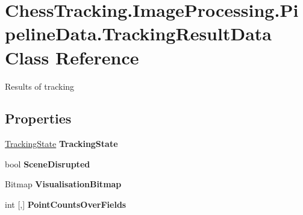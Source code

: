 \hypertarget{class_chess_tracking_1_1_image_processing_1_1_pipeline_data_1_1_tracking_result_data}{}\section{Chess\+Tracking.\+Image\+Processing.\+Pipeline\+Data.\+Tracking\+Result\+Data Class Reference}
\label{class_chess_tracking_1_1_image_processing_1_1_pipeline_data_1_1_tracking_result_data}


Results of tracking  


\subsection*{Properties}
\begin{DoxyCompactItemize}
\item 
\mbox{\label{class_chess_tracking_1_1_image_processing_1_1_pipeline_data_1_1_tracking_result_data_a9535578fbe17caebeecff0a6591f88fe}} 
\mbox{\hyperlink{class_chess_tracking_1_1_multithreading_messages_1_1_tracking_state}{Tracking\+State}} {\bfseries Tracking\+State}
\item 
\mbox{\label{class_chess_tracking_1_1_image_processing_1_1_pipeline_data_1_1_tracking_result_data_a6497dd361aa532bdbe596ecf581f285c}} 
bool {\bfseries Scene\+Disrupted}
\item 
\mbox{\label{class_chess_tracking_1_1_image_processing_1_1_pipeline_data_1_1_tracking_result_data_a67fdee53b73ecbb0cc863de747548439}} 
Bitmap {\bfseries Visualisation\+Bitmap}
\item 
\mbox{\label{class_chess_tracking_1_1_image_processing_1_1_pipeline_data_1_1_tracking_result_data_a9f7bc08d4b571d0a30ec96509a16b1c5}} 
int \mbox{[},\mbox{]} {\bfseries Point\+Counts\+Over\+Fields}
\end{DoxyCompactItemize}


